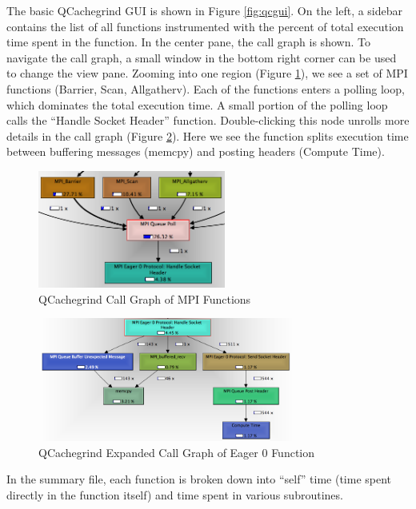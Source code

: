 The basic QCachegrind GUI is shown in Figure \ref{fig:qcgui}.
On the left, a sidebar contains the list of all functions instrumented with the percent of total execution time spent in the function.
In the center pane, the call graph is shown.
To navigate the call graph, a small window in the bottom right corner can be used to change the view pane.
Zooming into one region (Figure \ref{fig:qcgraphone}), we see a set of MPI functions (Barrier, Scan, Allgatherv).
Each of the functions enters a polling loop, which dominates the total execution time.
A small portion of the polling loop calls the ``Handle Socket Header'' function.
Double-clicking this node unrolls more details in the call graph (Figure \ref{fig:qcgraphtwo}).
Here we see the function splits execution time between buffering messages (memcpy) and posting headers (Compute Time).

\begin{figure}[h!]
\centering
\includegraphics[width=0.55\textwidth]{figures/graphviz/callgraph1.png}
\caption{QCachegrind Call Graph of MPI Functions}
\label{fig:qcgraphone}
\end{figure}

\begin{figure}[h!]
\centering
\includegraphics[width=0.75\textwidth]{figures/graphviz/callgraph2.png}
\caption{QCachegrind Expanded Call Graph of Eager 0 Function}
\label{fig:qcgraphtwo}
\end{figure}

In the summary file, each function is broken down into ``self'' time (time spent directly in the function itself)
and time spent in various subroutines.

